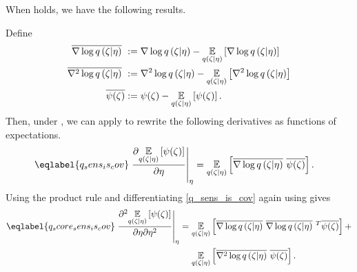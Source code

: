 
%
When  holds, we have the following results.
%

\begin{lem}
%
Define
%
\begin{align*}
%
\lqgradbar{\zeta \vert \eta} :={}& \lqgrad{\zeta \vert \eta}
  - \expect{\q(\zeta \vert \eta)}{\lqgrad{\zeta \vert \eta}} \\
\lqhessbar{\zeta \vert \eta} :={}& \lqhess{\zeta \vert \eta}
 - \expect{\q(\zeta \vert \eta)}{\lqhess{\zeta \vert \eta}} \\
\overline{\psi(\zeta)} :={}& \psi(\zeta)
 - \expect{\q(\zeta \vert \eta)}{\psi(\zeta)}.
%
\end{align*}
%
Then, under , we can apply \citet[Theorem
1]{giordano:2018:covariances} to rewrite the following derivatives as functions
of expectations.
%
\begin{align}\eqlabel{q_sens_is_cov}
%
\fracat{\partial \expect{\q(\zeta \vert \eta)}
              {\psi(\zeta)}}{\partial \eta}{\eta} ={}&
\expect{\q(\zeta \vert \eta)}
       {\lqgradbar{\zeta \vert \eta} \overline{\psi(\zeta)}}.
%
\end{align}
%
Using the product rule and differentiating \eqref{q_sens_is_cov} again using
gives
%
\begin{align}\eqlabel{q_score_sens_is_cov}
%
\fracat{\partial^2 \expect{\q(\zeta \vert \eta)}
              {\psi(\zeta)}}{\partial \eta \partial \eta^2}{\eta} ={}&
\expect{\q(\zeta \vert \eta)}
       {\lqgradbar{\zeta \vert \eta} \lqgradbar{\zeta \vert \eta}^T
        \overline{\psi(\zeta)} } +
\nonumber\\&
\expect{\q(\zeta \vert \eta)}{
       \lqhessbar{\zeta \vert \eta}
        \overline{\psi(\zeta)}
       }.
%
\end{align}
%
\end{lem}



